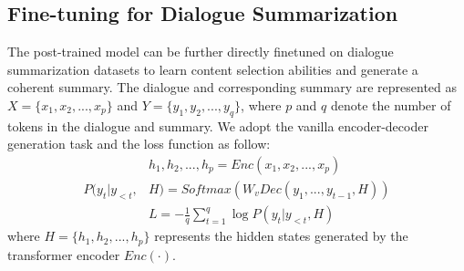 \subsection{Fine-tuning for Dialogue Summarization}

The post-trained model can be further directly finetuned on dialogue summarization datasets to learn content selection abilities and generate a coherent summary.
The dialogue and corresponding summary are represented as $X =\{x_1, x_2, ..., x_p\}$ and $Y=\{y_1, y_2, ..., y_q\}$, where $p$ and $q$ denote the number of tokens in the dialogue and summary. We adopt the vanilla encoder-decoder generation task and the loss function as follow:
\begin{equation}
	\begin{aligned}
		&h_1, h_2, ..., h_p = Enc(x_1, x_2, ..., x_p)\\
		P(y_t|y_{<t},&H) = Softmax(W_vDec(y_1, ..., y_{t-1}, H))\\
		&L = -\frac{1}{q}\sum_{t=1}^{q}\log P(y_t|y_{<t},H)
	\end{aligned}
\end{equation}
where $H=\{h_1, h_2, ..., h_p\}$ represents the hidden states generated by the transformer encoder $Enc(\cdot)$.





